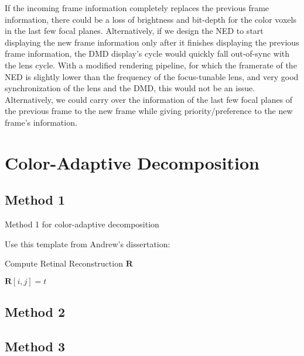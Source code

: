 If the incoming frame information completely replaces the previous frame information, there could be a loss of brightness and bit-depth for the color voxels in the last few focal planes. Alternatively, if we design the NED to start displaying the new frame information only after it finishes displaying the previous frame information, the DMD display's cycle would quickly fall out-of-sync with the lens cycle. With a modified rendering pipeline, for which the framerate of the NED is slightly lower than the frequency of the focus-tunable lens, and very good synchronization of the lens and the DMD, this would not be an issue. Alternatively, we could carry over the information of the last few focal planes of the previous frame to the new frame while giving priority/preference to the new frame's information. 

\section{Color-Adaptive Decomposition}
\subsection{Method 1}

\begin{algorithm}
    \caption{Method 1 for color-adaptive decomposition}
    \label{alg:colorAdaptiveMethodOne}
    \begin{algorithmic}
        \ENDIF
        \ENDFOR
    \end{algorithmic}
\end{algorithm}

Use this template from Andrew's dissertation:
\begin{algorithm}
    \caption{Compute Retinal Reconstruction $\mathbf{R}$}
    \label{alg:retinalReconstruction}
    \begin{algorithmic}
            \STATE $\mathbf{R}[i,j] = t$
        \ENDFOR
    \ENDFOR
    \end{algorithmic}
\end{algorithm}

\subsection{Method 2}

\subsection{Method 3}
